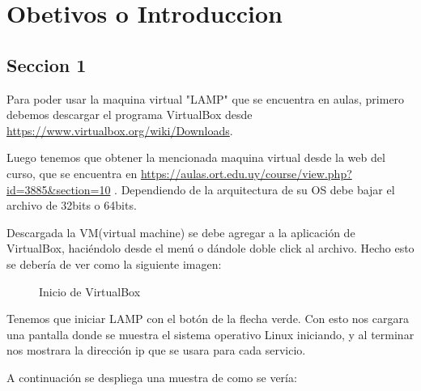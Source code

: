 \chapter{Obetivos o Introduccion}
    \section{Seccion 1}
    Para poder usar la maquina virtual "LAMP" que se encuentra en aulas, primero debemos descargar el programa VirtualBox desde \url{https://www.virtualbox.org/wiki/Downloads}.
    
    Luego tenemos que obtener la mencionada maquina virtual desde la web del curso, que se encuentra en \url{https://aulas.ort.edu.uy/course/view.php?id=3885&section=10} .
    Dependiendo de la arquitectura de su OS debe bajar el archivo de 32bits o 64bits.
    
    Descargada la VM(virtual machine) se debe agregar a la aplicación de VirtualBox, haciéndolo desde el menú o dándole doble click al archivo. Hecho esto se debería de ver como la siguiente imagen:
    \begin{figure} [H]
            \centering
            \caption{Inicio de VirtualBox}
    \end{figure}
    
    \clearpage
    Tenemos que iniciar LAMP con el botón de la flecha verde. Con esto nos cargara una pantalla donde se muestra el sistema operativo Linux iniciando, y al terminar nos mostrara la dirección ip que se usara para cada servicio.
    
    A continuación se despliega una muestra de como se vería:
    
